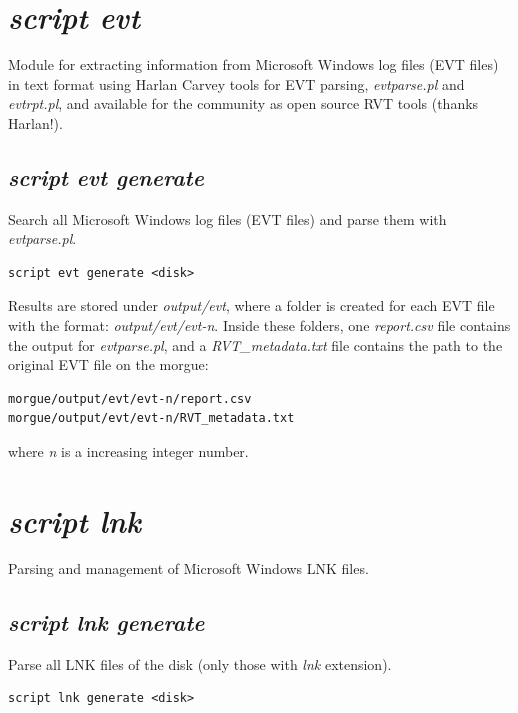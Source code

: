 \documentclass[a4paper,11pt,oneside]{report}
\begin{document}
\section{\emph{script evt }}

Module for extracting information from Microsoft Windows log files (EVT files) in text format using Harlan Carvey tools for EVT parsing, \emph{evtparse.pl} and \emph{evtrpt.pl}, and available for the community as open source RVT tools (thanks Harlan!). 

\subsection{\emph{script evt generate}}

Search all Microsoft Windows log files (EVT files) and parse them with  \emph{evtparse.pl}.

\begin{verbatim}
script evt generate <disk>
\end{verbatim}

Results are stored under \emph{output/evt}, where a folder is created for each EVT file with the format:  \emph{output/evt/evt-n}. Inside these folders, one \emph{report.csv} file contains the output for \emph{evtparse.pl}, and a \emph{RVT\_metadata.txt} file contains the path to the original EVT file on the morgue:

\begin{verbatim}
morgue/output/evt/evt-n/report.csv
morgue/output/evt/evt-n/RVT_metadata.txt
\end{verbatim}

where \emph{n} is a increasing integer number.






\section{\emph{script lnk}}


Parsing and management of Microsoft Windows LNK files.

\subsection{\emph{script lnk generate}} 

Parse all LNK files of the disk (only those with \emph{lnk} extension).

\begin{verbatim}
script lnk generate <disk>
\end{verbatim}
\end{document}
